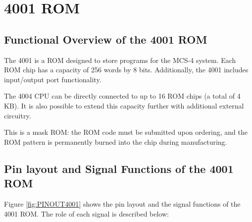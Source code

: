 \section{4001 ROM}
\subsection{Functional Overview of the 4001 ROM}
The 4001 is a ROM designed to store programs for the MCS-4 system. Each ROM chip has a capacity of 256 words by 8 bits. Additionally, the 4001 includes input/output port functionality.

The 4004 CPU can be directly connected to up to 16 ROM chips (a total of 4 KB). It is also possible to extend this capacity further with additional external circuitry.

This is a mask ROM: the ROM code must be submitted upon ordering, and the ROM pattern is permanently burned into the chip during manufacturing.

\subsection{Pin layout and Signal Functions of the 4001 ROM}
Figure \ref{fig:PINOUT4001} shows the pin layout and the signal functions of the 4001 ROM. The role of each signal is described below:

